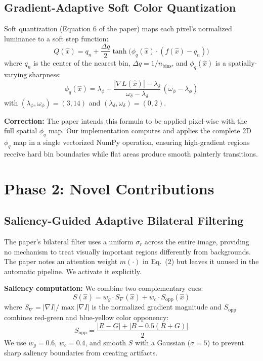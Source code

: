 \documentclass[conference]{IEEEtran}
\begin{document}
\subsection{Gradient-Adaptive Soft Color Quantization}

Soft quantization (Equation 6 of the paper) maps each pixel's normalized luminance to a soft step function:
\begin{equation}
Q(\hat{x}) = q_n + \frac{\Delta q}{2} \tanh\!\bigl(\phi_q(\hat{x})\cdot(f(\hat{x}) - q_n)\bigr)
\label{eq:quant}
\end{equation}
where $q_n$ is the center of the nearest bin, $\Delta q = 1/n_\text{bins}$, and $\phi_q(\hat{x})$ is a spatially-varying sharpness:
\begin{equation}
\phi_q(\hat{x}) = \lambda_\phi + \frac{|\nabla L(\hat{x})| - \lambda_\delta}{\omega_\delta - \lambda_\delta}\,(\omega_\phi - \lambda_\phi)
\end{equation}
with $(\lambda_\phi, \omega_\phi) = (3, 14)$ and $(\lambda_\delta, \omega_\delta) = (0, 2)$.

\textbf{Correction:} The paper intends this formula to be applied pixel-wise with the full spatial $\phi_q$ map. Our implementation computes and applies the complete 2D $\phi_q$ map in a single vectorized NumPy operation, ensuring high-gradient regions receive hard bin boundaries while flat areas produce smooth painterly transitions.

\section{Phase 2: Novel Contributions}

\subsection{Saliency-Guided Adaptive Bilateral Filtering}

The paper's bilateral filter uses a uniform $\sigma_r$ across the entire image, providing no mechanism to treat visually important regions differently from backgrounds. The paper notes an attention weight $m(\cdot)$ in Eq.~(2) but leaves it unused in the automatic pipeline. We activate it explicitly.

\textbf{Saliency computation:} We combine two complementary cues:
\begin{equation}
S(\hat{x}) = w_g \cdot S_\nabla(\hat{x}) + w_c \cdot S_\text{opp}(\hat{x})
\end{equation}
where $S_\nabla = |\nabla I|/\max|\nabla I|$ is the normalized gradient magnitude and $S_\text{opp}$ combines red-green and blue-yellow color opponency:
\begin{equation}
S_\text{opp} = \frac{|R-G| + |B - 0.5(R+G)|}{2}
\end{equation}
We use $w_g = 0.6$, $w_c = 0.4$, and smooth $S$ with a Gaussian ($\sigma = 5$) to prevent sharp saliency boundaries from creating artifacts.
\end{document}
